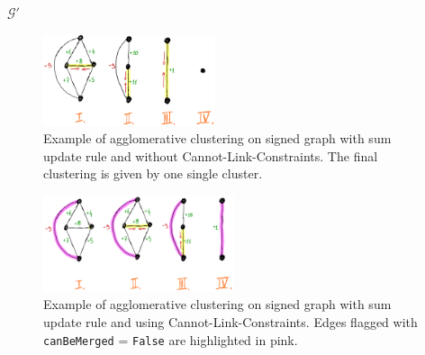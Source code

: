 \begin{algorithm}
\begin{algorithmic}[1]
      \State
      \State
      \Return $\mathcal{G}'$



  \end{algorithmic}
  \label{main_alg}
\end{algorithm}


\begin{figure}
\centering
\includegraphics[width=0.45\textwidth,trim=0.in 0.in 0.in 0.in,clip]{./figs/aggl_clust.png}
\caption{\small 
Example of agglomerative clustering on signed graph with sum update rule and without Cannot-Link-Constraints. The final clustering is given by one single cluster.
\label{fig:example_non_unique_weights_1}}
\end{figure}


\begin{figure}
\centering
\includegraphics[width=0.50\textwidth,trim=0.in 0.in 0.in 0.in,clip]{./figs/aggl_clust_with_nonlink.png}
\caption{\small 
Example of agglomerative clustering on signed graph with sum update rule and using Cannot-Link-Constraints. Edges flagged with \texttt{canBeMerged} = \texttt{False} are highlighted in pink. 
\label{fig:example_non_unique_weights_2}}
\end{figure}


